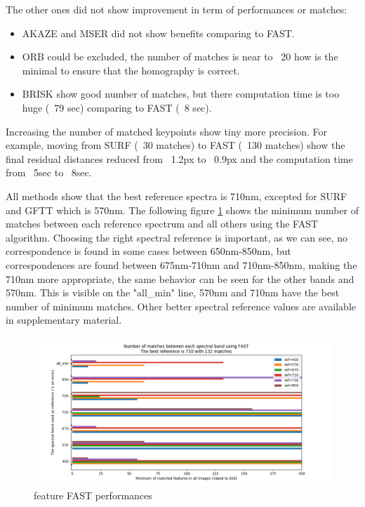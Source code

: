 \documentclass[]{elsarticle}
\begin{document}
	\noindent
	The other ones did not show improvement in term of performances or matches:
	\begin{itemize}
		\item AKAZE and MSER did not show benefits comparing to FAST.
		\item ORB could be excluded, the number of matches is near to ~20 how is the minimal to ensure that the homography is correct.
		\item BRISK show good number of matches, but there computation time is too huge (~79 sec) comparing to FAST (~8 sec).
	\end{itemize}
	
	Increasing the number of matched keypoints show tiny more precision. For example, moving from SURF (~30 matches) to FAST (~130 matches)
	show the final residual distances reduced from ~1.2px to ~0.9px and the computation time from ~5sec to ~8sec.
	
	All methods show that the best reference spectra is 710nm, excepted for SURF and GFTT which is 570nm.
	The following figure \ref{fig:features-FAST-performances} shows the minimum number of matches between each reference spectrum and all others using the FAST algorithm.
	Choosing the right spectral reference is important, as we can see, no correspondence is found in some cases between 650nm-850nm,
	but correspondences are found between 675nm-710nm and 710nm-850nm, making the 710nm more appropriate,
	the same behavior can be seen for the other bands and 570nm.
	This is visible on the "all\_min" line, 570nm and 710nm have the best number of minimum matches.
	Other better spectral reference values are available in supplementary material.
	
	\begin{figure}[!htb]
		\centering
		\includegraphics[width=\linewidth]{../figures/comparaison-keypoint-matching-reference-FAST.png}
		\caption{feature FAST performances}
		\label{fig:features-FAST-performances}
	\end{figure}
	
\end{document}
